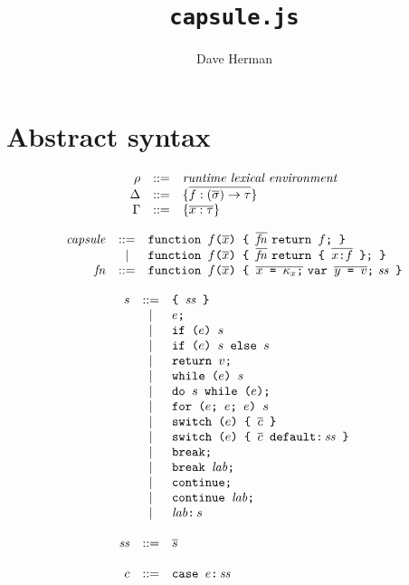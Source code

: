 \documentclass{article}
\newcommand{\funty}[2]{({#1}) \rightarrow {#2}}
\newcommand{\seq}[1]{\overline{{#1}}}
\newcommand{\mathjs}[1]{\mbox{\texttt{{#1}}}}
\newcommand{\return}[1]{\mathjs{return }{#1}\mathjs{;}}
\newcommand{\fun}[3]{\mathjs{function }{#1}\mathjs{(}{#2}\mathjs{) \{ }{#3}\mathjs{ \}}}
\newcommand{\var}[1]{\mathjs{var }{#1}\mathjs{;}}
\newcommand{\while}[2]{\mathjs{while (}{#1}\mathjs{) }{#2}}
\newcommand{\dowhile}[2]{\mathjs{do }{#1}\mathjs{ while (}{#2}\mathjs{);}}
\newcommand{\for}[4]{\mathjs{for (}{#1}\mathjs{; }{#2}\mathjs{; }{#3}\mathjs{) }{#4}}
\newcommand{\switch}[2]{\mathjs{switch (}{#1}\mathjs{) \{ }{#2}\mathjs{ \}}}
\newcommand{\switchdef}[3]{\mathjs{switch (}{#1}\mathjs{) \{ }{#2}\mathjs{ default:}\,{#3}\mathjs{ \}}}
\newcommand{\brk}{\mathjs{break;}}
\newcommand{\brkl}[1]{\mathjs{break }{#1}\mathjs{;}}
\newcommand{\cont}{\mathjs{continue;}}
\newcommand{\contl}[1]{\mathjs{continue }{#1}\mathjs{;}}
\newcommand{\lab}[2]{{#1}\mathjs{:}\,{#2}}
\newcommand{\ifthen}[2]{\mathjs{if (}{#1}\mathjs{) }{#2}}
\newcommand{\ifthenelse}[3]{\mathjs{if (}{#1}\mathjs{) }{#2}\mathjs{ else }{#3}}
\newcommand{\block}[1]{\mathjs{\{ }{#1}\mathjs{ \}}}
\begin{document}
\title{\texttt{capsule.js}}
\author{Dave Herman}
\maketitle

\section{Abstract syntax}

\[
\begin{array}{rcl}
\rho & ::= & \mbox{\textit{runtime lexical environment}} \\
\Delta & ::= & \{ \seq{f : \funty{\seq{\sigma}}{\tau} } \} \\
\Gamma & ::= & \{ \seq{x : \tau} \} \\
\end{array}
\]

\[
\begin{array}{rcl}
\mathit{capsule} & ::= & \fun{f}{\seq{x}}{\seq{\mathit{fn}}\ \return{f}} \\
                 &  |  & \fun{f}{\seq{x}}{\seq{\mathit{fn}}\ \return{\mathjs{\{ } \seq{x \mathjs{:} f} \mathjs{ \}}}} \\
\mathit{fn} & ::= & \fun{f}{\seq{x}}{\seq{x\mathjs{ = }\kappa_x\mathjs{;}}\ \var{\seq{y\mathjs{ = }v}}\ \mathit{ss}} \\
\end{array}
\]

\[
\begin{array}{rcl}
s & ::= & \block{\mathit{ss}} \\
  &  |  & e\mathjs{;} \\
  &  |  & \ifthen{e}{s} \\
  &  |  & \ifthenelse{e}{s}{s} \\
  &  |  & \return{v} \\
  &  |  & \while{e}{s} \\
  &  |  & \dowhile{s}{e} \\
  &  |  & \for{e}{e}{e}{s} \\
  &  |  & \switch{e}{\seq{c}} \\
  &  |  & \switchdef{e}{\seq{c}}{\mathit{ss}} \\
  &  |  & \brk \\
  &  |  & \brkl{\mathit{lab}} \\
  &  |  & \cont \\
  &  |  & \contl{\mathit{lab}} \\
  &  |  & \lab{\mathit{lab}}{s} \\
\\
\mathit{ss} & ::= & \seq{s} \\
\\
c & ::= & \mathjs{case }e\mathjs{:}\,\mathit{ss} \\
\end{array}
\]
\end{document}
